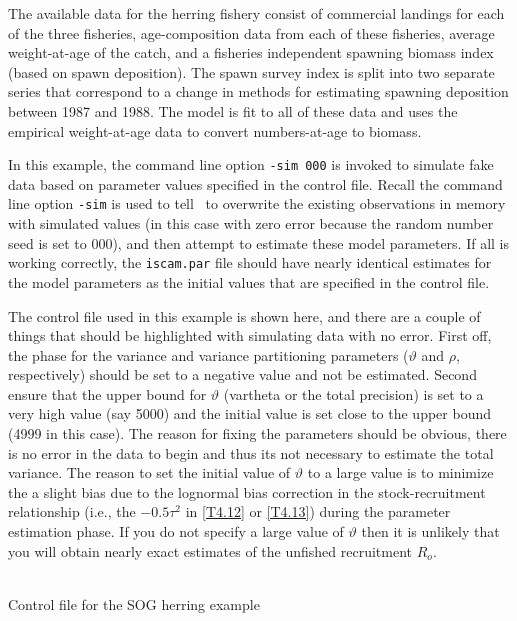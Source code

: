 \begin{multicols}{2}
The available data for the herring fishery consist of commercial landings for each of the three fisheries, age-composition data from each of these fisheries, average weight-at-age of the catch, and a fisheries independent spawning biomass index (based on spawn deposition).  The spawn survey index is split into two separate series that correspond to a change in methods for estimating spawning deposition between 1987 and 1988.  The model is fit to all of these data and uses the empirical weight-at-age data to convert numbers-at-age to biomass.




In this example, the command line option \texttt{-sim 000} is invoked to simulate fake data based on parameter values specified in the control file.  Recall the command line option \texttt{-sim} is used to tell \iscam\ to overwrite the existing observations in memory with simulated values (in this case with zero error because the random number seed is set to 000), and then attempt to estimate these model parameters.  If all is working correctly, the \texttt{iscam.par} file should have nearly identical estimates for the model parameters as the initial values that are specified in the control file.

The control file used in this example is shown here, and there are a couple of things that should be highlighted with simulating data with no error.  First off, the phase for the variance and variance partitioning parameters ($\vartheta$ and $\rho$, respectively) should be set to a negative value and not be estimated.  Second ensure that the upper bound for $\vartheta$ (vartheta or the total precision) is set to a very high value (say 5000) and the initial value is set close to the upper bound (4999 in this case).  The reason for fixing the parameters should be obvious, there is no error in the data to begin and thus its not necessary to estimate the total variance.  The reason to set the initial value of $\vartheta$ to a large value is to minimize the a slight bias due to the lognormal bias correction in the stock-recruitment relationship (i.e., the $-0.5\tau^2$ in \ref{T4.12} or \ref{T4.13}) during the parameter estimation phase.  If you do not specify a large value of $\vartheta$ then it is unlikely that you will obtain nearly exact estimates of the unfished recruitment $R_o$.


\noindent \hrulefill\\
\small
Control file for the SOG herring example
\tiny
\begin{alltt}

\end{alltt}
\hrulefill
\normalsize



\end{multicols}





